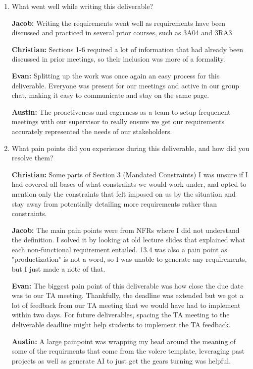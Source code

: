\documentclass[12pt]{article}
\begin{document}
\begin{enumerate}
  \item What went well while writing this deliverable?
  
  \textbf{Jacob: } Writing the requirements went well as requirements have been discussed and practiced in several prior courses, such as 3A04 and 3RA3

  \textbf{Christian: } Sections 1-6 required a lot of information that had already been discussed in prior meetings, so their inclusion was more of a formality.

  \textbf{Evan: } Splitting up the work was once again an easy process for this deliverable. Everyone was present for our meetings and active in our group chat, making it easy to communicate and stay on the same page.

  \textbf{Austin: } The proactiveness and eagerness as a team to setup frequenent meetings with our supervisor to really ensure we get our requirements accurately represented the needs of our stakeholders.

  \item What pain points did you experience during this deliverable, and how did you resolve them?

  \textbf{Christian: } Some parts of Section 3 (Mandated Constraints) I was unsure if I had covered all bases of what constraints we would work under, and opted to mention only the constraints that felt imposed on us by the situation and stay away from potentially detailing more requirements rather than constraints.

  \textbf{Jacob: } The main pain points were from NFRs where I did not understand the definition. I solved it by looking at old lecture slides that explained what each non-functional requirement entailed. 13.4 was also a pain point as "productization" is not a word, so I was unable to generate any requirements, but I just made a note of that.

  \textbf{Evan: } The biggest pain point of this deliverable was how close the due date was to our TA meeting. Thankfully, the deadline was extended but we got a lot of feedback from our TA meeting that we would have had to implement within two days. For future deliverables, spacing the TA meeting to the deliverable deadline might help students to implement the TA feedback.

  \textbf{Austin: } A large painpoint was wrapping my head around the meaning of some of the requirments that come from the volere template, leveraging past projects as well as generate AI to just get the gears turning was helpful.


\end{enumerate}
\end{document}
